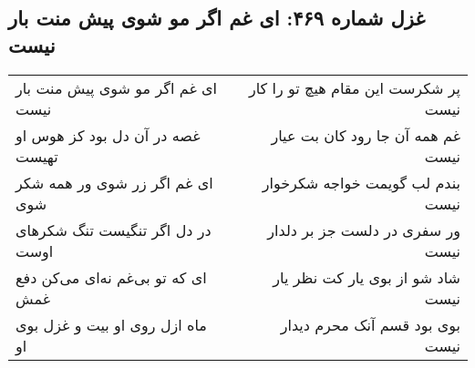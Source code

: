 \begin{center}
\section*{غزل شماره ۴۶۹: ای غم اگر مو شوی پیش منت بار نیست}
\label{sec:0469}
\begin{longtable}{l p{0.5cm} r}
ای غم اگر مو شوی پیش منت بار نیست
&&
پر شکرست این مقام هیچ تو را کار نیست
\\
غصه در آن دل بود کز هوس او تهیست
&&
غم همه آن جا رود کان بت عیار نیست
\\
ای غم اگر زر شوی ور همه شکر شوی
&&
بندم لب گویمت خواجه شکرخوار نیست
\\
در دل اگر تنگیست تنگ شکرهای اوست
&&
ور سفری در دلست جز بر دلدار نیست
\\
ای که تو بی‌غم نه‌ای می‌کن دفع غمش
&&
شاد شو از بوی یار کت نظر یار نیست
\\
ماه ازل روی او بیت و غزل بوی او
&&
بوی بود قسم آنک محرم دیدار نیست
\\
\end{longtable}
\end{center}
